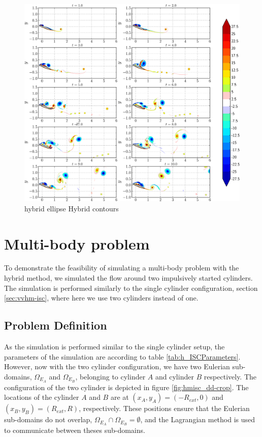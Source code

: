 	\begin{figure}[!p]
	\centering
	\includegraphics[width=\linewidth]{./figures/validation/ellipse/hybrid_ellipse_Hybrid_contours_compressed-crop.png}
	\caption{hybrid ellipse Hybrid contours}
	\label{fig:hybrid_ellipse_Hybrid_contours}
	\end{figure}
	
\section{Multi-body problem}
\label{sec:vvhm-mb}

To demonstrate the feasibility of simulating a multi-body problem with the hybrid method, we simulated the flow around two impulsively started cylinders. The simulation is performed similarly to the single cylinder configuration, section \ref{sec:vvhm-isc}, where here we use two cylinders instead of one.

\subsection{Problem Definition}

As the simulation is performed similar to the single cylinder setup, the parameters of the simulation are according to table \ref{tab:h_ISCParameters}. However, now with the two cylinder configuration, we have two Eulerian sub-domains, $\Omega_{E_{A}}$ and $\Omega_{E_B}$, belonging to cylinder $A$ and cylinder $B$ respectively. The configuration of the two cylinder is depicted in figure \ref{fig:hmisc_dd-crop}. The locations of the cylinder $A$ and $B$ are at $(x_A,y_A) = (-R_{ext},0)$ and $(x_B,y_B) = (R_{ext},R)$, respectively. These positions ensure that the Eulerian sub-domains do not overlap, $\Omega_{E_A}\cap\Omega_{E_B}=\emptyset$, and the Lagrangian method is used to communicate between theses sub-domains.

